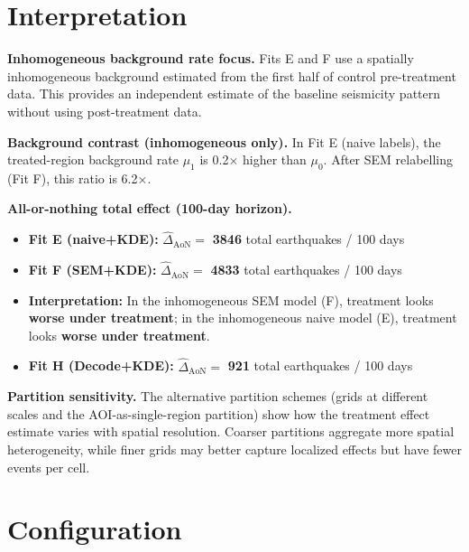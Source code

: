 \documentclass[
]{article}
\providecommand{\tightlist}{%
  \setlength{\itemsep}{0pt}\setlength{\parskip}{0pt}}
\begin{document}
\endgroup{}

\section{Interpretation}\label{interpretation}

\textbf{Inhomogeneous background rate focus.} Fits E and F use a
spatially inhomogeneous background estimated from the first half of
control pre-treatment data. This provides an independent estimate of the
baseline seismicity pattern without using post-treatment data.

\textbf{Background contrast (inhomogeneous only).} In Fit E (naive
labels), the treated-region background rate \(\mu_1\) is 0.2\(\times\)
higher than \(\mu_0\). After SEM relabelling (Fit F), this ratio is
6.2\(\times\).

\textbf{All-or-nothing total effect (100-day horizon).}

\begin{itemize}
\tightlist
\item
  \textbf{Fit E (naive+KDE):} \(\hat\Delta_{\text{AoN}}=\) \textbf{3846}
  total earthquakes / 100 days
\item
  \textbf{Fit F (SEM+KDE):} \(\hat\Delta_{\text{AoN}}=\) \textbf{4833}
  total earthquakes / 100 days
\item
  \textbf{Interpretation:} In the inhomogeneous SEM model (F), treatment
  looks \textbf{worse under treatment}; in the inhomogeneous naive model
  (E), treatment looks \textbf{worse under treatment}.
\item
  \textbf{Fit H (Decode+KDE):} \(\hat\Delta_{\text{AoN}}=\) \textbf{921}
  total earthquakes / 100 days
\end{itemize}

\textbf{Partition sensitivity.} The alternative partition schemes (grids
at different scales and the AOI-as-single-region partition) show how the
treatment effect estimate varies with spatial resolution. Coarser
partitions aggregate more spatial heterogeneity, while finer grids may
better capture localized effects but have fewer events per cell.

\section{Configuration}\label{configuration}
\end{document}
